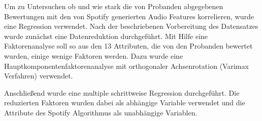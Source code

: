 Um zu Untersuchen ob und wie stark die von Probanden abgegebenen Bewertungen mit den von Spotify generierten Audio Features korrelieren, wurde eine Regression verwendet.
Nach der beschriebenen Vorbereitung des Datensatzes wurde zunächst eine Datenreduktion durchgeführt.
Mit Hilfe eine Faktorenanalyse soll so aus den 13 Attributen, die von den Probanden bewertet wurden, einige wenige Faktoren werden.
Dazu wurde eine Hauptkomponentenfaktorenanalyse mit orthogonaler Achsenrotation (Varimax Verfahren) verwendet.

Anschließend wurde eine multiple schrittweise Regression durchgeführt.
Die reduzierten Faktoren wurden dabei als abhängige Variable verwendet und die Attribute des Spotify Algorithmus als unabhängige Variablen.
